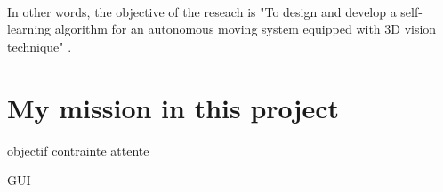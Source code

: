~~

In other words, the objective of the reseach is "To design and develop a self-learning algorithm for an autonomous moving system equipped with 3D vision technique" \cite{bib:niharika}.



\section{My mission in this project}

objectif 
contrainte 
attente 

\gls{GUI}


